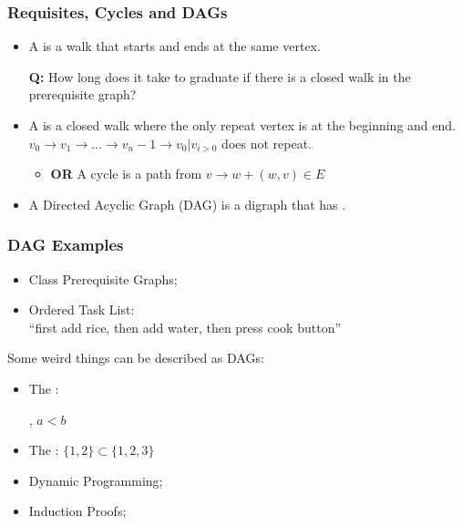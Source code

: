 \documentclass{beamer}
\begin{document}
\begin{frame}
  \frametitle{Requisites, Cycles and DAGs}

  {\large
    \begin{itemize}
    \item A  is a walk that starts and ends at
      the same vertex.\\
      \begin{center}
        {\bf Q:} How long does it take to graduate if there is a
        closed walk in the prerequisite graph?
      \end{center}

      \bigskip

    \item A  is a closed walk where the only repeat
      vertex is at the beginning and end.\\
      $v_0 \rightarrow v_1 \rightarrow \ldots \rightarrow v_n-1 \rightarrow v_0 | v_{i > 0}$ does not repeat.
      \begin{itemize}
        \item {\bf OR} A cycle is a path from $v \rightarrow w + (w,v) \in E$
      \end{itemize}
      \bigskip

    \item A \alert{Directed Acyclic Graph (DAG)} is a digraph that has
      .
    \end{itemize}

  }
\end{frame}

\begin{frame}
  \frametitle{DAG Examples}

    \begin{itemize}
      \item Class Prerequisite Graphs;
      \item Ordered Task List:\\
        ``first add rice, then add water, then press cook button''
        \bigskip
    \end{itemize}
    \bigskip

    Some weird things can be described as DAGs:
    \bigskip

    \begin{itemize}
      \item The :
        , $a < b$

        \bigskip

      \item The : $\{1,2\} \subset
        \{1,2,3\}$
      \item Dynamic Programming;
      \item Induction Proofs;
    \end{itemize}
\end{frame}
\end{document}
